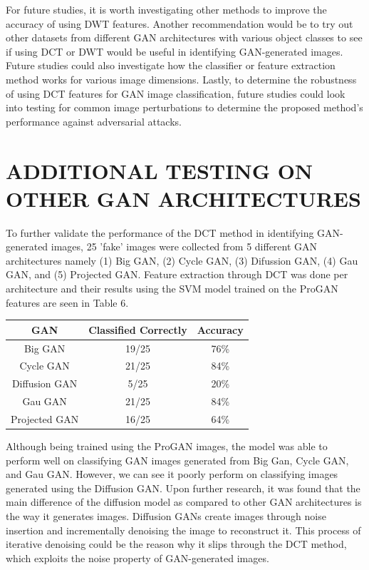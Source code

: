 \documentclass{icsthesis}
\begin{document}
\begin{mainmatter}
For future studies, it is worth investigating other methods to improve the accuracy of using DWT features. Another recommendation would be to try out other datasets from different GAN architectures with various object classes to see if using DCT or DWT would be useful in identifying GAN-generated images. Future studies could also investigate how the classifier or feature extraction method works for various image dimensions. Lastly, to determine the robustness of using DCT features for GAN image classification, future studies could look into testing for common image perturbations to determine the proposed method's performance against adversarial attacks. 




\appendices

\section{ADDITIONAL TESTING ON OTHER GAN ARCHITECTURES}
To further validate the performance of the DCT method in identifying GAN-generated images, 25 'fake' images were collected from 5 different GAN architectures namely (1) Big GAN, (2) Cycle GAN, (3) Difussion GAN, (4) Gau GAN, and (5) Projected GAN. Feature extraction through DCT was done per architecture and their results using the SVM model trained on the ProGAN features are seen in Table 6.

\begin{table}[H]
\centering
\begin{tabular}{|c|c|c|}
\hline
GAN           & Classified Correctly & Accuracy \\ \hline
Big GAN       & 19/25                & 76\%     \\ \hline
Cycle GAN     & 21/25                & 84\%     \\ \hline
Diffusion GAN & 5/25                 & 20\%     \\ \hline
Gau GAN       & 21/25                & 84\%     \\ \hline
Projected GAN & 16/25                & 64\%     \\ \hline
\end{tabular}
\end{table}


Although being trained using the ProGAN images, the model was able to perform well on classifying GAN images generated from Big Gan, Cycle GAN, and Gau GAN. However, we can see it poorly perform on classifying images generated using the Diffusion GAN. Upon further research, it was found that the main difference of the diffusion model as compared to other GAN architectures is the way it generates images. Diffusion GANs create images through noise insertion and incrementally denoising the image to reconstruct it. This process of iterative denoising could be the reason why it slips through the DCT method, which exploits the noise property of GAN-generated images. 
		
  
			
	\end{mainmatter}
\end{document}
